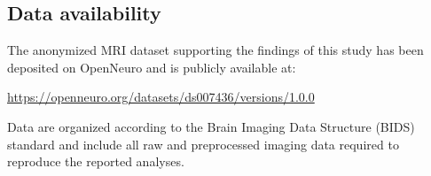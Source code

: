 \documentclass{article}
\begin{document}
\subsection*{Data availability}

The anonymized MRI dataset supporting the findings of this study has been deposited on OpenNeuro and is publicly available at:

\url{https://openneuro.org/datasets/ds007436/versions/1.0.0}

Data are organized according to the Brain Imaging Data Structure (BIDS) standard and include all raw and preprocessed imaging data required to reproduce the reported analyses.


\begin{appendices}
\setcounter{figure}{0}
\renewcommand{\thefigure}{S\arabic{figure}}






\printbibliography

\end{appendices}
\end{document}
